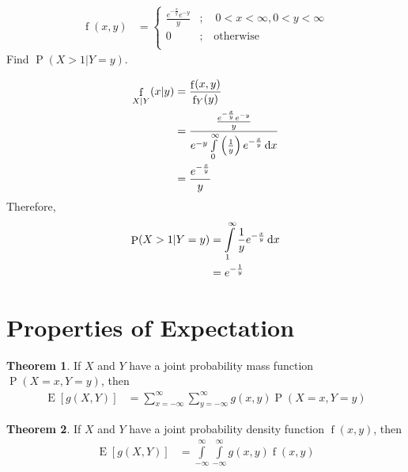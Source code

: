 \documentclass[titlepage, fleqn, a4paper, 12pt, twoside]{article}
\theoremstyle{definition}
\theoremstyle{theorem}
\newtheorem{theorem}{Theorem}
\DeclareMathOperator{\prob}{\mathrm{P}}
\DeclareMathOperator{\expct}{\mathrm{E}}
\DeclareMathOperator{\pdf}{\mathrm{f}}
\begin{document}
\begin{question}
	\begin{align*}
		\pdf(x,y) &=
			\begin{cases}
				\frac{e^{-\frac{x}{y}} e^{-y}}{y} & ;\quad 0 < x < \infty , 0 < y < \infty \\
				0                                 & ;\quad \text{otherwise}                \\
			\end{cases}
	\end{align*}
	Find $\prob(X > 1 | Y = y)$.
\end{question}

\begin{solution}
	\begin{align*}
		\pdf_{X|Y}(x|y) & = \frac{\pdf(x,y)}{\pdf_Y(y)}                                                                                                  \\
                                & = \frac{\frac{e^{-\frac{x}{y}} e^{-y}}{y}}{e^{-y} \int\limits_{0}^{\infty} \left( \frac{1}{y} \right) e^{-\frac{x}{y}} \dif x} \\
                                & = \frac{e^{-\frac{x}{y}}}{y}
	\end{align*}
	Therefore,
	\begin{align*}
		\prob(X > 1 | Y = y) & = \int\limits_{1}^{\infty} \frac{1}{y} e^{-\frac{x}{y}} \dif x \\
                                     & = e^{-\frac{1}{y}}
	\end{align*}
\end{solution}

\section{Properties of Expectation}

\begin{theorem}
	If $X$ and $Y$ have a joint probability mass function $\prob(X = x , Y = y)$, then
	\begin{align*}
		\expct\left[ g(X,Y) \right] & = \sum\limits_{x = -\infty}^{\infty} \sum\limits_{y = -\infty}^{\infty} g(x,y) \prob(X = x , Y = y)
	\end{align*}
\end{theorem}

\begin{theorem}
	If $X$ and $Y$ have a joint probability density function $\pdf(x,y)$, then
	\begin{align*}
		\expct\left[ g(X,Y) \right] & = \int\limits_{-\infty}^{\infty} \int\limits_{-\infty}^{\infty} g(x,y) \pdf(x,y)
	\end{align*}
\end{theorem}
\end{document}
